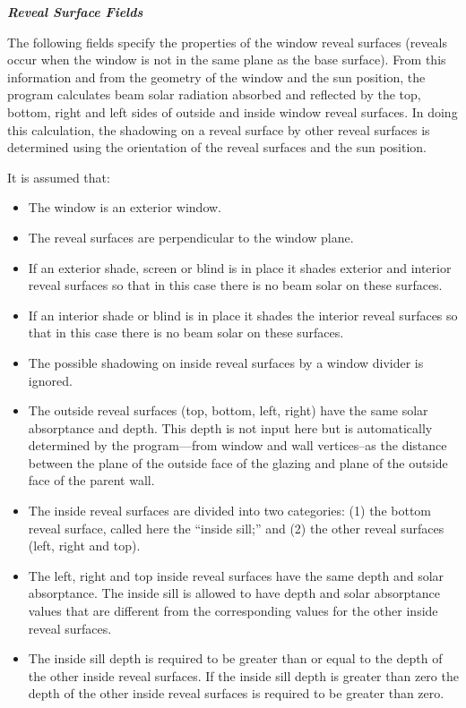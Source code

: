 \textbf{\emph{Reveal Surface Fields}}

The following fields specify the properties of the window reveal surfaces (reveals occur when the window is not in the same plane as the base surface). From this information and from the geometry of the window and the sun position, the program calculates beam solar radiation absorbed and reflected by the top, bottom, right and left sides of outside and inside window reveal surfaces. In doing this calculation, the shadowing on a reveal surface by other reveal surfaces is determined using the orientation of the reveal surfaces and the sun position.

It is assumed that:

\begin{itemize}
\item
  The window is an exterior window.
\item
  The reveal surfaces are perpendicular to the window plane.
\item
  If an exterior shade, screen or blind is in place it shades exterior and interior reveal surfaces so that in this case there is no beam solar on these surfaces.
\item
  If an interior shade or blind is in place it shades the interior reveal surfaces so that in this case there is no beam solar on these surfaces.
\item
  The possible shadowing on inside reveal surfaces by a window divider is ignored.
\item
  The outside reveal surfaces (top, bottom, left, right) have the same solar absorptance and depth. This depth is not input here but is automatically determined by the program---from window and wall vertices--as the distance between the plane of the outside face of the glazing and plane of the outside face of the parent wall.
\item
  The inside reveal surfaces are divided into two categories: (1) the bottom reveal surface, called here the ``inside sill;'' and (2) the other reveal surfaces (left, right and top).
\item
  The left, right and top inside reveal surfaces have the same depth and solar absorptance. The inside sill is allowed to have depth and solar absorptance values that are different from the corresponding values for the other inside reveal surfaces.
\item
  The inside sill depth is required to be greater than or equal to the depth of the other inside reveal surfaces. If the inside sill depth is greater than zero the depth of the other inside reveal surfaces is required to be greater than zero.

\end{itemize}
